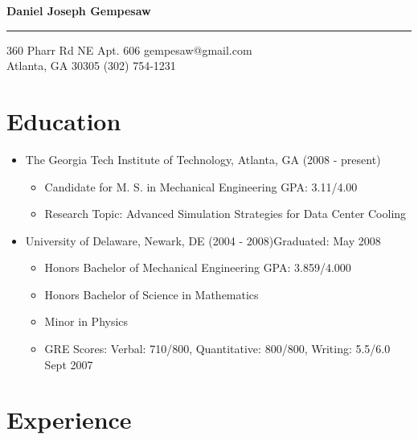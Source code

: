\documentclass[10pt]{article}
\newenvironment{myitem}{
\begin{itemize}
  \setlength{\itemsep}{1pt}
  \setlength{\parskip}{0pt}
  \setlength{\parsep}{0pt}
}{\end{itemize}}
\begin{document}
\begin{center} 
\Large 
\textbf{Daniel Joseph Gempesaw} 
\end{center} 
\hrule 
\vspace{0.2 cm}
\normalsize
360 Pharr Rd NE Apt. 606 \hfill gempesaw@gmail.com\\
Atlanta, GA 30305 \hfill (302) 754-1231\\
\vspace{-.60 cm}

\section{Education}
\vspace{-0.25cm}
  \begin{myitem}
\item The Georgia Tech Institute of Technology, Atlanta, GA \hfill (2008 - present)
\begin{myitem}
\item Candidate for M. S. in Mechanical Engineering \hfill GPA: 3.11/4.00
\item Research Topic: Advanced Simulation Strategies for Data Center Cooling
\end{myitem}
\item University of Delaware, Newark, DE (2004 - 2008)\hfill Graduated: May 2008
\begin{myitem}
\item Honors Bachelor of Mechanical Engineering \hfill GPA: 3.859/4.000\item Honors Bachelor of Science in Mathematics
\item Minor in Physics
\item GRE Scores: Verbal: 710/800, Quantitative: 800/800, Writing: 5.5/6.0 \hfill Sept 2007
\end{myitem}
\end{myitem}

\vspace{-0.45 cm}
\section{Experience}
\vspace{-0.25cm}
\end{document}
